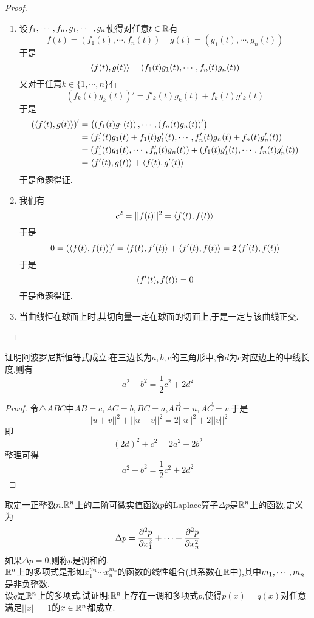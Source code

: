 \documentclass{ctexart}
\begin{document}
\begin{proof}
    \begin{enumerate}[label=\tbf{(\arabic*)}]
        \item 设${f}_1,\cdots,{f}_{n},{g}_1,\cdots,{g}_{n}$使得对任意$t\in\mathbb{R}$有
            \[f(t)=\left(f_1(t),\cdots,f_n(t)\right)\ \ \ \ \ g(t)=\left(g_1(t),\cdots,g_n(t)\right)\]
            于是
            \[\left\langle{f(t)},{g(t)}\right\rangle=\left(f_1(t)g_1(t),\cdots,f_n(t)g_n(t)\right)\]
            又对于任意$k\in\{1,\cdots,n\}$有
            \[\left(f_k(t)g_k(t)\right)'=f'_k(t)g_k(t)+f_k(t)g'_k(t)\]
            于是
            \[\begin{aligned}
                \left(\left\langle{f(t)},{g(t)}\right\rangle\right)'
                &= \left(\left(f_1(t)g_1(t)\right),\cdots,\left(f_n(t)g_n(t)\right)'\right) \\
                &= \left(f'_1(t)g_1(t)+f_1(t)g'_1(t),\cdots,f'_n(t)g_n(t)+f_n(t)g'_n(t)\right) \\
                &= \left(f'_1(t)g_1(t),\cdots,f'_n(t)g_n(t)\right)+\left(f_1(t)g'_1(t),\cdots,f_n(t)g'_n(t)\right) \\
                &= \left\langle{f'(t)},{g(t)}\right\rangle+\left\langle{f(t)},{g'(t)}\right\rangle
            \end{aligned}\]
            于是命题得证.
        \item 我们有
            \[c^2=||f(t)||^2=\left\langle{f(t)},{f(t)}\right\rangle\]
            于是
            \[0=\left(\left\langle{f(t)},{f(t)}\right\rangle\right)'=\left\langle{f(t)},{f'(t)}\right\rangle+\left\langle{f'(t)},{f(t)}\right\rangle=2\left\langle{f'(t)},{f(t)}\right\rangle\]
            于是
            \[\left\langle{f'(t)},{f(t)}\right\rangle=0\]
            于是命题得证.
        \item 当曲线恒在球面上时,其切向量一定在球面的切面上,于是一定与该曲线正交.
    \end{enumerate}
\end{proof}
\begin{problem}[34.]
    证明阿波罗尼斯恒等式成立:在三边长为$a,b,c$的三角形中,令$d$为$c$对应边上的中线长度,则有
    \[a^2+b^2=\dfrac12c^2+2d^2\]
\end{problem}
\begin{proof}
    令$\triangle ABC$中$AB=c,AC=b,BC=a$,$\overrightarrow{AB}=u,\overrightarrow{AC}=v$.于是
    \[||u+v||^2+||u-v||^2=2||u||^2+2||v||^2\]
    即
    \[\left(2d\right)^2+c^2=2a^2+2b^2\]
    整理可得
    \[a^2+b^2=\dfrac12c^2+2d^2\]
\end{proof}
\begin{problem}[35.]
    取定一正整数$n$.$\mathbb{R}^n$上的二阶可微实值函数$p$的Laplace算子$\Delta p$是$\mathbb{R}^n$上的函数,定义为
    \[\Delta p=\dfrac{\partial^2p}{\partial x_1^2}+\cdots+\dfrac{\partial^2 p}{\partial x_n^2}\]
    如果$\Delta p=0$,则称$p$是调和的.\\
    $\mathbb{R}^n$上的多项式是形如$x_1^{m_1}\cdots x_n^{m_n}$的函数的线性组合(其系数在$\mathbb{R}$中),其中${m}_1,\cdots,{m}_{n}$是非负整数.\\
    设$q$是$\mathbb{R}^n$上的多项式.试证明:$\mathbb{R}^n$上存在一调和多项式$p$,使得$p(x)=q(x)$对任意满足$||x||=1$的$x\in\mathbb{R}^n$都成立.
\end{problem}
\end{document}
